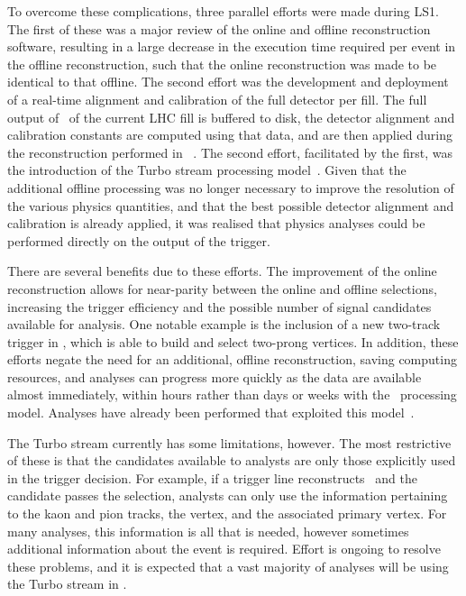 To overcome these complications, three parallel efforts were made during 
\ac{LS1}.
The first of these was a major review of the online and offline reconstruction 
software, resulting in a large decrease in the execution time required per 
event in the offline reconstruction, such that the online reconstruction was 
made to be identical to that offline.
The second effort was the development and deployment of a real-time alignment 
and calibration of the full detector per fill.
The full output of \hltone\ of the current \ac{LHC} fill is buffered to disk, 
the detector alignment and calibration constants are computed using that data, 
and are then applied during the reconstruction performed in 
\hlttwo~\cite{Dujany:082010}.
The second effort, facilitated by the first, was the introduction of the Turbo 
stream processing model~\cite{Benson:2019752}.
Given that the additional offline processing was no longer necessary to improve 
the resolution of the various physics quantities, and that the best possible 
detector alignment and calibration is already applied, it was realised that 
physics analyses could be performed directly on the output of the trigger.

There are several benefits due to these efforts.
The improvement of the online reconstruction allows for near-parity between the 
online and offline selections, increasing the trigger efficiency and the 
possible number of signal candidates available for analysis.
One notable example is the inclusion of a new two-track trigger in \hltone, 
which is able to build and select two-prong vertices.
In addition, these efforts negate the need for an additional, offline 
reconstruction, saving computing resources,
 and analyses can progress more quickly as the data are available almost 
 immediately, within hours rather than days or weeks with the \runone\ 
 processing model.
 Analyses have already been performed that exploited this 
 model~\cite{LHCb-PAPER-2015-037,Aaij:2015bpa}.

 The Turbo stream currently has some limitations, however.
 The most restrictive of these is that the candidates available to analysts are 
 only those explicitly used in the trigger decision.
 For example, if a trigger line reconstructs \DzToKpi\ and the candidate passes 
 the selection, analysts can only use the information pertaining to the kaon 
 and pion tracks, the \PDzero vertex, and the associated primary vertex.
 For many analyses, this information is all that is needed, however sometimes 
 additional information about the event is required.
 Effort is ongoing to resolve these problems, and it is expected that a vast 
 majority of analyses will be using the Turbo stream in \runthree.

